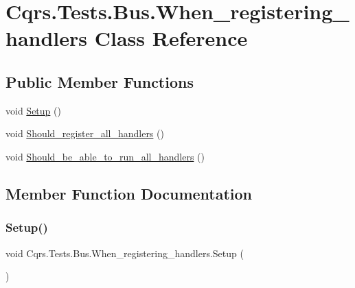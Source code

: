 \hypertarget{classCqrs_1_1Tests_1_1Bus_1_1When__registering__handlers}{}\section{Cqrs.\+Tests.\+Bus.\+When\+\_\+registering\+\_\+handlers Class Reference}
\label{classCqrs_1_1Tests_1_1Bus_1_1When__registering__handlers}
\subsection*{Public Member Functions}
\begin{DoxyCompactItemize}
\item 
void \hyperlink{classCqrs_1_1Tests_1_1Bus_1_1When__registering__handlers_ab61fae616b3c6f1af8343dcf4c4abe36}{Setup} ()
\item 
void \hyperlink{classCqrs_1_1Tests_1_1Bus_1_1When__registering__handlers_a8f41a12f1de270204fba571220948411}{Should\+\_\+register\+\_\+all\+\_\+handlers} ()
\item 
void \hyperlink{classCqrs_1_1Tests_1_1Bus_1_1When__registering__handlers_a8e91b8af597ea769f4239b40d148347c}{Should\+\_\+be\+\_\+able\+\_\+to\+\_\+run\+\_\+all\+\_\+handlers} ()
\end{DoxyCompactItemize}


\subsection{Member Function Documentation}
\mbox{\label{classCqrs_1_1Tests_1_1Bus_1_1When__registering__handlers_ab61fae616b3c6f1af8343dcf4c4abe36}} 
\subsubsection{\texorpdfstring{Setup()}{Setup()}}
{\footnotesize\ttfamily void Cqrs.\+Tests.\+Bus.\+When\+\_\+registering\+\_\+handlers.\+Setup (\begin{DoxyParamCaption}{ }\end{DoxyParamCaption})}

